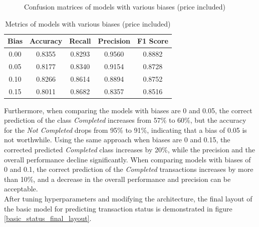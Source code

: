 \documentclass[12pt,twoside]{report}
\begin{document}
\begin{figure}[!htbp]
	\hfill
	\caption{Confusion matrices of models with various biases (price included)}
	\label{status_bias_cm}
\end{figure}

\begin{table}[!htbp]
	\centering
	\caption{Metrics of models with various biases (price included)}
	\label{status_bias_metrics}
	\begin{tabular}{| c | c | c | c | c |}
		\hline
		Bias & Accuracy & Recall & Precision & F1 Score \\
		\hline
		0.00 & 0.8355 & 0.8293 & 0.9560 & 0.8882 \\
		\hline
		0.05 & 0.8177 & 0.8340 & 0.9154 & 0.8728 \\
		\hline
		0.10 & 0.8266 & 0.8614 & 0.8894 & 0.8752 \\
		\hline
		0.15 & 0.8011 & 0.8682 & 0.8357 & 0.8516 \\
		\hline
	\end{tabular}
\end{table}

Furthermore, when comparing the models with biases are 0 and 0.05, the correct prediction of the class \textit{Completed} increases from 57\% to 60\%, but the accuracy for the \textit{Not Completed} drops from 95\% to 91\%, indicating that a bias of 0.05 is not worthwhile. Using the same approach when biases are 0 and 0.15, the corrected predicted \textit{Completed} class increases by 20\%, while the precision and the overall performance decline significantly. When comparing models with biases of 0 and 0.1, the correct prediction of the \textit{Completed} transactions increases by more than 10\%, and a decrease in the overall performance and precision can be acceptable. 
\\

After tuning hyperparameters and modifying the architecture, the final layout of the basic model for predicting transaction status is demonstrated in figure \ref{basic_status_final_layout}. 
\end{document}
